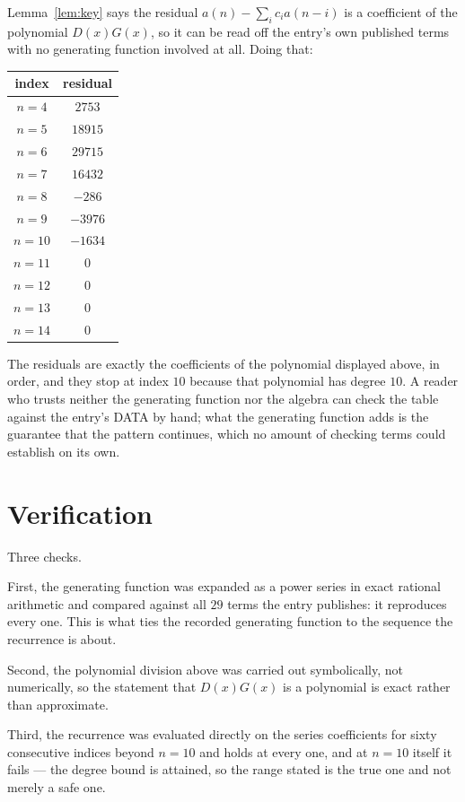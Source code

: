\documentclass[11pt,a4paper]{article}
\theoremstyle{plain}
\theoremstyle{definition}
\begin{document}
Lemma~\ref{lem:key} says the residual $a(n)-\sum_ic_ia(n-i)$ is a coefficient of the
polynomial $D(x)G(x)$, so it can be read off the entry's own published terms with no
generating function involved at all. Doing that:
\begin{center}
\begin{tabular}{cc}
index & residual \\ \hline
$n=4$ & $2753$ \\
$n=5$ & $18915$ \\
$n=6$ & $29715$ \\
$n=7$ & $16432$ \\
$n=8$ & $-286$ \\
$n=9$ & $-3976$ \\
$n=10$ & $-1634$ \\
$n=11$ & $0$ \\
$n=12$ & $0$ \\
$n=13$ & $0$ \\
$n=14$ & $0$
\end{tabular}
\end{center}
The residuals are exactly the coefficients of the polynomial displayed above, in order, and
they stop at index $10$ because that polynomial has degree $10$. A reader who trusts
neither the generating function nor the algebra can check the table against the entry's DATA
by hand; what the generating function adds is the guarantee that the pattern continues, which
no amount of checking terms could establish on its own.

\section{Verification}

Three checks.

First, the generating function was expanded as a power series in exact rational arithmetic and
compared against all $29$ terms the entry publishes: it reproduces every one. This is
what ties the recorded generating function to the sequence the recurrence is about.

Second, the polynomial division above was carried out symbolically, not numerically, so the
statement that $D(x)G(x)$ is a polynomial is exact rather than approximate.

Third, the recurrence was evaluated directly on the series coefficients for sixty consecutive
indices beyond $n=10$ and holds at every one, and at $n=10$ itself it fails --- the
degree bound is attained, so the range stated is the true one and not merely a safe one.
\end{document}
